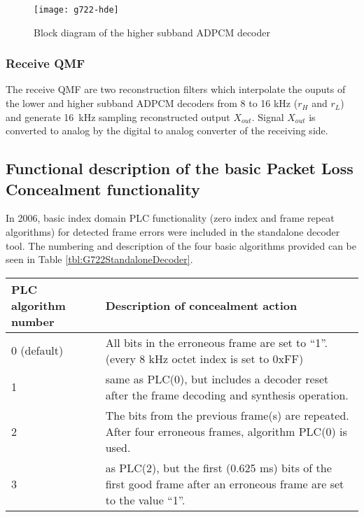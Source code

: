 \begin{figure}
    \begin{center}
        \texttt{[image: g722-hde]}
  \end{center}
  \caption{Block diagram of the higher subband ADPCM decoder
           \label{G.722:high-decoder}}
\end{figure}

\subsubsection{Receive QMF}

The receive QMF are two reconstruction filters which interpolate the
ouputs of the lower and higher subband ADPCM decoders from 8 to 16 kHz
($r_H$ and $r_L$) and generate 16~kHz sampling reconstructed output
$X_{out}$. Signal $X_{out}$ is converted to analog by the digital to
analog converter of the receiving side.

\newpage

\subsection{Functional description of the basic Packet Loss Concealment functionality}

In 2006, basic index domain PLC functionality (zero index and frame
repeat algorithms) for detected frame errors were included in the
standalone decoder tool. The numbering and description of the four
basic algorithms provided can be seen in Table
\ref{tbl:G722StandaloneDecoder}.

\begin{table}[h]
  \begin{center}
  \begin{tabular}{|l|p{7cm}|}
	
\hline
PLC algorithm number & Description of concealment action \\
\hline
0 (default) & All bits in the erroneous frame are set to ``1''. (every 8 kHz octet index is set to 0xFF) \\
\hline
1	& same as PLC(0), but includes a decoder reset after the frame
decoding and synthesis operation.\\
\hline
2 & The bits from the previous frame(s) are repeated. After four erroneous frames, algorithm PLC(0) is used.  \\
\hline
3	& as PLC(2), but the first (0.625 ms) bits of the first good frame  after an erroneous frame are set to the value ``1''.  \\
\hline
  \end{tabular}
  \end{center}
\end{table}

